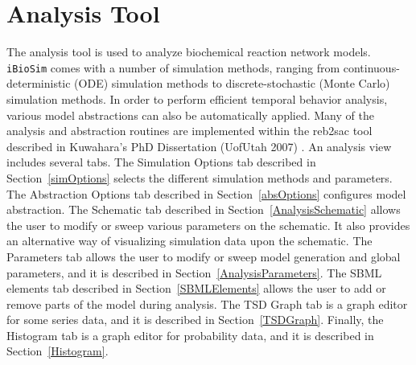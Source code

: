 \documentclass[titlepage,11pt]{article}
\begin{document}







\clearpage

\section{\label{Analysis}Analysis Tool}

\noindent
The analysis tool is used to analyze biochemical reaction network models.  {\tt iBioSim} comes with a number of simulation methods, ranging from continuous-deterministic (ODE) simulation methods to discrete-stochastic (Monte Carlo) simulation methods.  In order to perform efficient temporal behavior analysis, various model abstractions can also be automatically applied.  Many of the analysis and abstraction routines are implemented
within the reb2sac tool described in 
Kuwahara's PhD Dissertation (UofUtah 2007)
.  An analysis view includes several tabs.  The Simulation Options tab described in Section~\ref{simOptions} selects the different simulation methods and parameters.  The Abstraction Options tab described in Section~\ref{absOptions} configures model abstraction.  The Schematic tab described in Section~\ref{AnalysisSchematic} allows the user to modify or sweep various parameters on the schematic.  It also provides an alternative way of visualizing simulation data upon the schematic.  The Parameters tab allows the user to modify or sweep model generation and global parameters, and it is described in Section~\ref{AnalysisParameters}.  The SBML elements tab described in Section~\ref{SBMLElements} allows the user to add or remove parts of the model during analysis.  The TSD Graph tab is a graph editor for some series data, and it is described in Section~\ref{TSDGraph}.  Finally, the Histogram tab is a graph editor for probability data, and it is described in Section~\ref{Histogram}.
\end{document}
